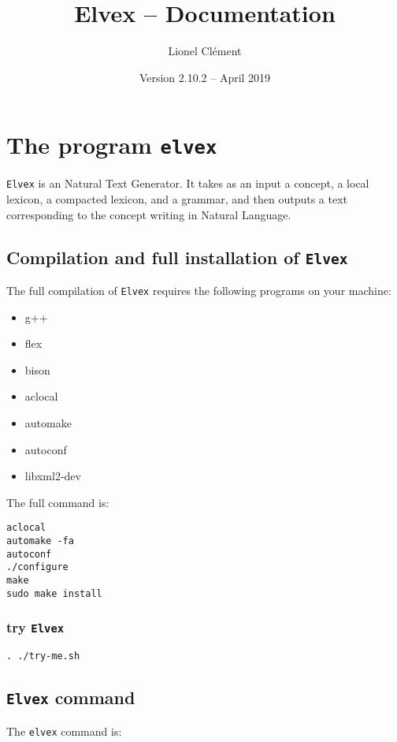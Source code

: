 \documentclass[11pt]{article}
\title{Elvex -- Documentation}
\author{Lionel Clément}
\date{Version 2.10.2 -- April 2019}
\begin{document}
\maketitle
\section{The program \texttt{elvex}}

\texttt{Elvex} is an Natural Text Generator. It takes as an input a
concept, a local lexicon, a compacted lexicon, and a grammar, and then
outputs a text corresponding to the concept writing in Natural
Language.

\subsection*{Compilation and full installation of \texttt{Elvex}}

The full compilation of \texttt{Elvex} requires the following programs on your machine:

\begin{itemize}
\item g++
\item flex
\item bison
\item aclocal
\item automake
\item autoconf
\item libxml2-dev
\end{itemize}

The full command is:

\begin{lstlisting}[frame=none, numbers=none]
aclocal
automake -fa
autoconf
./configure
make
sudo make install
\end{lstlisting}

\subsubsection{try \texttt{Elvex}}

\begin{lstlisting}[frame=none, numbers=none]
. ./try-me.sh
\end{lstlisting}

\subsection{\texttt{Elvex} command}

The \texttt{elvex} command is:\\
\end{document}
